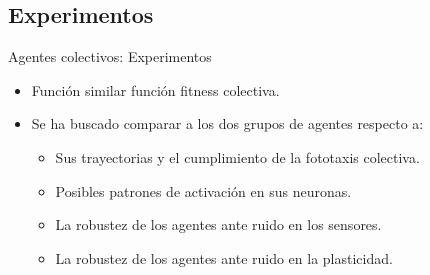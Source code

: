 \documentclass[aspectratio=169]{beamer}
\begin{document}
\subsection{Experimentos}
\begin{frame}{Agentes colectivos: Experimentos}
\begin{itemize}
  \item Función similar función fitness colectiva.
  \item Se ha buscado comparar a los dos grupos de agentes respecto a:
  \begin{itemize}
    \item Sus trayectorias y el cumplimiento de la fototaxis colectiva.
    \item Posibles patrones de activación en sus neuronas.
    \item La robustez de los agentes ante ruido en los sensores.
    \item La robustez de los agentes ante ruido en la plasticidad.
  \end{itemize}
\end{itemize}
\end{frame}
\end{document}
